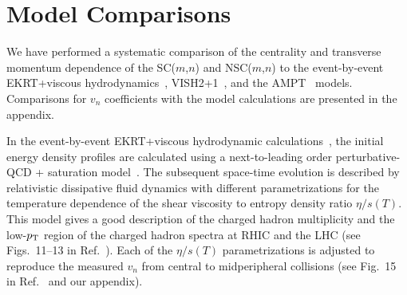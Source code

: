 \section{Model Comparisons}
\label{sec:theory}
We have performed a systematic comparison of the centrality and transverse momentum dependence of the SC($m$,$n$) and NSC($m$,$n$) to the event-by-event  EKRT+viscous hydrodynamics~\cite{Niemi:2015qia}, VISH2+1~\cite{Shen:2010uy,Shen:2014vra}, and the AMPT~\cite{Qian:2016pau,Lin:2004en,Lin:2014tya} models. Comparisons for $v_n$ coefficients with the model calculations are presented in the appendix.

In the event-by-event EKRT+viscous hydrodynamic calculations~\cite{Niemi:2015qia}, the initial energy density profiles are calculated using a next-to-leading order perturbative-QCD + saturation model~\cite{Paatelainen:2012at,Paatelainen:2013eea}. The subsequent space-time evolution is described by relativistic dissipative fluid dynamics with different parametrizations for the temperature dependence of the shear viscosity to entropy density ratio $\eta/s(T)$. 
This model gives a good description of the charged hadron multiplicity and the low-$p_{\rm T}$ region of the charged hadron spectra at RHIC and the LHC (see Figs.~11--13 in Ref.~\cite{Niemi:2015qia}).
Each of the $\eta/s(T)$ parametrizations is adjusted to reproduce the measured $v_n$ from central to midperipheral collisions (see Fig.~15 in Ref.~\cite{Niemi:2015qia} and our appendix). 

